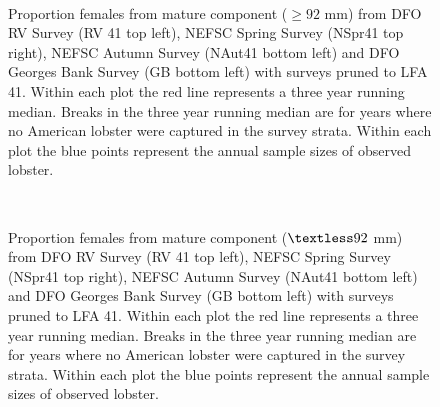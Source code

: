 \documentclass[11pt]{article}
\newcommand{\e}{/backup/bio_data/bio.lobster/figures/} %
\begin{document}
\begin{figure}
\centering
{}
\\

\caption{Proportion females from mature component ($ \ge 92$ mm) from DFO RV Survey (RV 41 top left), NEFSC Spring Survey (NSpr41 top right), NEFSC Autumn Survey (NAut41 bottom left) and DFO Georges Bank Survey (GB bottom left) with surveys pruned to LFA 41. Within each plot the red line represents a three year running median. Breaks in the three year running median are for years where no American lobster were captured in the survey strata. Within each plot the blue points represent the annual sample sizes of observed lobster.}
\end{figure}
\clearpage

\begin{figure}
\centering
{}
\\

\caption{Proportion females from mature component ($ \textless 92$ mm) from DFO RV Survey (RV 41 top left), NEFSC Spring Survey (NSpr41 top right), NEFSC Autumn Survey (NAut41 bottom left) and DFO Georges Bank Survey (GB bottom left) with surveys pruned to LFA 41. Within each plot the red line represents a three year running median. Breaks in the three year running median are for years where no American lobster were captured in the survey strata. Within each plot the blue points represent the annual sample sizes of observed lobster.}

\end{figure}
\clearpage


\end{document}
